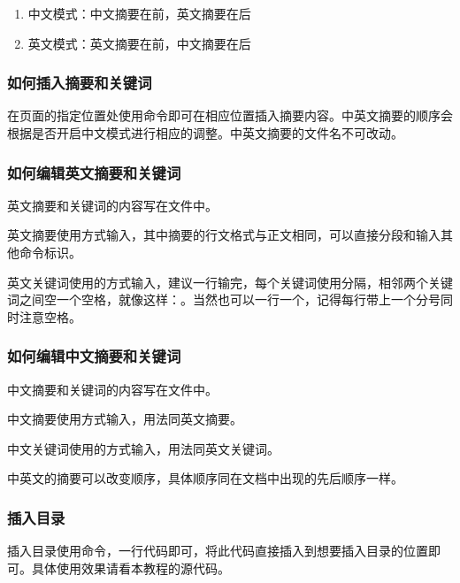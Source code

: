 \documentclass{nitthesis}
\begin{document}
\begin{enumerate}
    \item 中文模式：中文摘要在前，英文摘要在后
    \item 英文模式：英文摘要在前，中文摘要在后
\end{enumerate}

\subsubsection{如何插入摘要和关键词}

在页面的指定位置处使用命令即可在相应位置插入摘要内容。中英文摘要的顺序会根据是否开启中文模式进行相应的调整。中英文摘要的文件名不可改动。

\subsubsection{如何编辑英文摘要和关键词}

英文摘要和关键词的内容写在文件中。

英文摘要使用方式输入，其中摘要的行文格式与正文相同，可以直接分段和输入其他命令标识。

英文关键词使用的方式输入，建议一行输完，每个关键词使用\Code{;}分隔，相邻两个关键词之间空一个空格，就像这样：。当然也可以一行一个，记得每行带上一个分号同时注意空格。

\subsubsection{如何编辑中文摘要和关键词}

中文摘要和关键词的内容写在文件中。

中文摘要使用方式输入，用法同英文摘要。

中文关键词使用的方式输入，用法同英文关键词。

中英文的摘要可以改变顺序，具体顺序同在文档中出现的先后顺序一样。

\subsubsection{插入目录}

插入目录使用命令，一行代码即可，将此代码直接插入到想要插入目录的位置即可。具体使用效果请看本教程的源代码。
\end{document}
